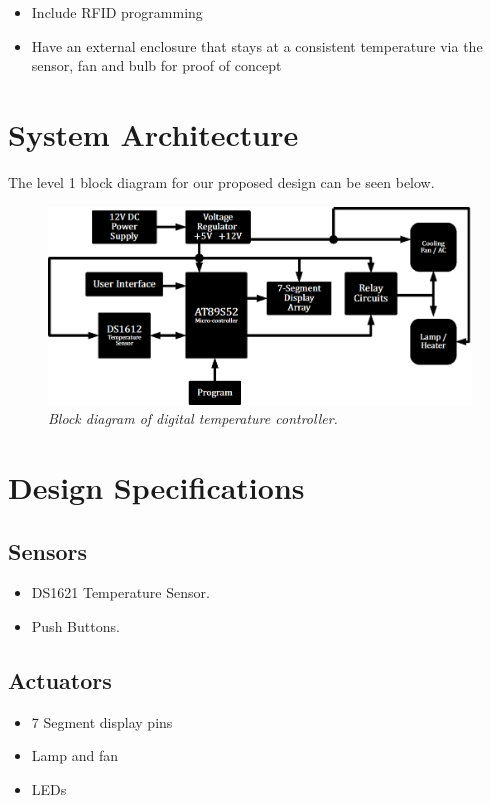 \documentclass[11pt]{article}
\begin{document}
\begin{itemize}
    \item Include RFID programming
\item Have an external enclosure that stays at a consistent temperature via the sensor, fan and bulb for proof of concept

\end{itemize}

\section*{System Architecture}
The level 1 block diagram for our proposed design can be seen below.
	
	\begin{figure}[H]
	\centering
	\includegraphics[width=7in]{images/TCU}
		\caption{\textit{Block diagram of digital temperature controller.}}
	\end{figure}

\section*{Design Specifications}

\subsection*{Sensors}
\begin{itemize}
    \item DS1621 Temperature Sensor.
    \item Push Buttons.

\end{itemize}

\subsection*{Actuators}
\begin{itemize}
    \item 7 Segment display pins
 \item Lamp and fan
\item LEDs
\end{itemize}
\end{document}
